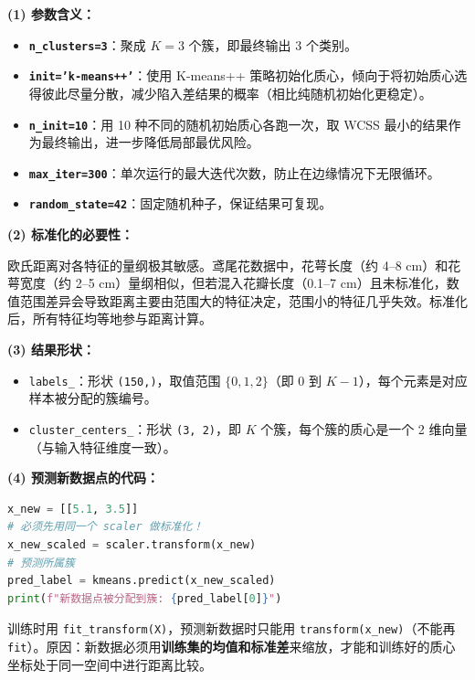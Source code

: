 \documentclass[a4paper,11pt]{ctexart}
\begin{document}
\begin{solutionbox}[参考答案与详细解析]
    \textbf{(1) 参数含义：}

    \begin{itemize}
        \item \textbf{\texttt{n\_clusters=3}}：聚成 $K=3$ 个簇，即最终输出 3 个类别。
        \item \textbf{\texttt{init='k-means++'}}：使用 K-means++ 策略初始化质心，倾向于将初始质心选得彼此尽量分散，减少陷入差结果的概率（相比纯随机初始化更稳定）。
        \item \textbf{\texttt{n\_init=10}}：用 10 种不同的随机初始质心各跑一次，取 WCSS 最小的结果作为最终输出，进一步降低局部最优风险。
        \item \textbf{\texttt{max\_iter=300}}：单次运行的最大迭代次数，防止在边缘情况下无限循环。
        \item \textbf{\texttt{random\_state=42}}：固定随机种子，保证结果可复现。
    \end{itemize}

    \textbf{(2) 标准化的必要性：}

    欧氏距离对各特征的量纲极其敏感。鸢尾花数据中，花萼长度（约 4--8 cm）和花萼宽度（约 2--5 cm）量纲相似，但若混入花瓣长度（0.1--7 cm）且未标准化，数值范围差异会导致距离主要由范围大的特征决定，范围小的特征几乎失效。标准化后，所有特征均等地参与距离计算。

    \textbf{(3) 结果形状：}

    \begin{itemize}
        \item \texttt{labels\_}：形状 \texttt{(150,)}，取值范围 $\{0, 1, 2\}$（即 $0$ 到 $K-1$），每个元素是对应样本被分配的簇编号。
        \item \texttt{cluster\_centers\_}：形状 \texttt{(3, 2)}，即 $K$ 个簇，每个簇的质心是一个 2 维向量（与输入特征维度一致）。
    \end{itemize}

    \textbf{(4) 预测新数据点的代码：}

    \begin{lstlisting}[language=Python]
x_new = [[5.1, 3.5]]
# 必须先用同一个 scaler 做标准化！
x_new_scaled = scaler.transform(x_new)
# 预测所属簇
pred_label = kmeans.predict(x_new_scaled)
print(f"新数据点被分配到簇: {pred_label[0]}")
    \end{lstlisting}

    \begin{keybox}
        训练时用 \texttt{fit\_transform(X)}，预测新数据时只能用 \texttt{transform(x\_new)}（不能再 \texttt{fit}）。原因：新数据必须用\textbf{训练集的均值和标准差}来缩放，才能和训练好的质心坐标处于同一空间中进行距离比较。
    \end{keybox}
\end{solutionbox}
\end{document}
